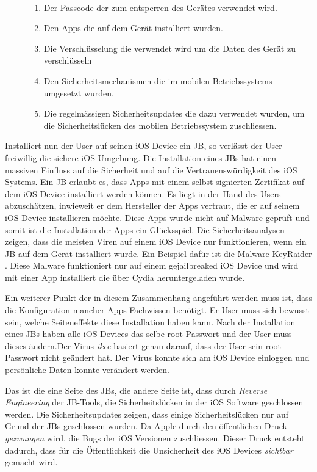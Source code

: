 \begin{description}
    \item[\parbox{\textwidth} {Die Sicherheit und Vertrauenswürdigkeit eines mobilen Gerätes hängt von mehreren Faktoren ab}]~\par
    \begin{enumerate}
        \item Der Passcode der zum entsperren des Gerätes verwendet wird.
        \item Den Apps die auf dem Gerät installiert wurden. 
        \item Die Verschlüsselung die verwendet wird um die Daten des Gerät zu verschlüsseln
        \item Den Sicherheitsmechanismen die im mobilen Betriebssystems umgesetzt wurden.
        \item Die regelmässigen Sicherheitsupdates die dazu verwendet wurden, um die Sicherheitslücken des mobilen Betriebssystem zuschliessen.  
    \end{enumerate}
\end{description} 
Installiert nun der User auf seinen iOS Device ein JB, so verlässt der User freiwillig die sichere iOS Umgebung. Die Installation eines JBs hat einen massiven Einfluss auf die Sicherheit und auf die Vertrauenswürdigkeit des iOS Systems. Ein JB erlaubt es, dass Apps mit einem selbst signierten Zertifikat auf dem iOS Device installiert werden können. Es liegt in der Hand des Users abzuschätzen, inwieweit er dem Hersteller der Apps vertraut, die er auf seinem iOS Device installieren möchte. Diese Apps wurde nicht auf Malware geprüft und somit ist die Installation der Apps ein Glücksspiel. Die Sicherheitsanalysen zeigen, dass die meisten Viren auf einem iOS Device nur funktionieren, wenn ein JB auf dem Gerät installiert wurde. Ein Beispiel dafür ist die Malware KeyRaider \cite{KeyRaider}. Diese Malware funktioniert nur auf einem gejailbreaked iOS Device und wird mit einer App installiert die über Cydia heruntergeladen wurde. \par 
 Ein weiterer Punkt der in diesem Zusammenhang angeführt werden muss ist, dass die Konfiguration mancher Apps Fachwissen benötigt.  Er User muss sich bewusst sein, welche Seiteneffekte diese Installation haben kann. Nach der Installation eines JBs haben alle iOS Devices das selbe root-Passwort und der User muss dieses ändern.Der Virus \textit{\glqq ikee\grqq{}} basiert genau darauf, dass der User sein root-Passwort nicht geändert hat. Der Virus konnte sich am iOS Device einloggen und persönliche Daten konnte verändert werden.\par 
 
Das ist die eine Seite des JBs, die andere Seite ist, dass durch \textit{\glqq Reverse Engineering\grqq{}} der JB-Tools, die Sicherheitslücken in der iOS Software geschlossen werden. Die Sicherheitsupdates zeigen, dass einige Sicherheitslücken nur auf Grund der JBs geschlossen wurden. Da Apple durch den öffentlichen Druck \textit{\glqq gezwungen\grqq{}} wird, die Bugs der iOS Versionen zuschliessen. Dieser Druck entsteht dadurch, dass für die Öffentlichkeit die Unsicherheit des iOS Devices \textit{\glqq sichtbar\grqq{}} gemacht wird. 



